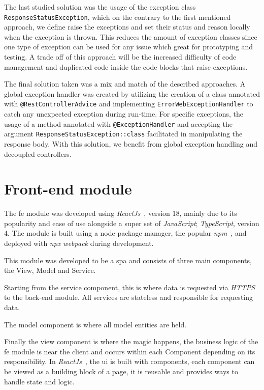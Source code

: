 The last studied solution was the usage of the exception class  \texttt{ResponseStatusException}, which on the contrary to the first mentioned approach, we define raise the exceptions and set their status and reason locally when the exception is thrown. This reduces the amount of exception classes since one type of exception can be used for any issue which great for prototyping and testing. A trade off of this approach will be the increased difficulty of code management and duplicated code inside the code blocks that raise exceptions. 

The final solution taken was a mix and match of the described approaches. A global exception handler was created by utilizing the creation of a class annotated with \texttt{@RestControllerAdvice} and implementing \texttt{ErrorWebExceptionHandler} to catch any unexpected exception during run-time. For specific exceptions, the usage of a method annotated with \texttt{@ExceptionHandler} and accepting the argument \texttt{ResponseStatusException::class} facilitated in manipulating the response body. With this solution, we benefit from global exception handling and decoupled controllers.


\section{Front-end module}

The \acrshort{fe} module was developed using \textit{ReactJs}~\cite{reactjs}, version 18, mainly due to its popularity and ease of use alongside a super set of \textit{JavaScript}; \textit{TypeScript}, version 4. The module is built using a node package manager, the popular \textit{npm}~\cite{npm}, and deployed with \textit{npx webpack} during development. 

This module was developed to be a \acrfull{spa} and consists of three main components, the View, Model and Service.

Starting from the service component, this is where data is requested via \textit{HTTPS} to the back-end module.
All services are stateless and responsible for requesting data.

The model component is where all model entities are held. 

Finally the view component is where the magic happens, the business logic of the \acrfull{fe} module is near the client and occurs within each Component depending on its responsibility.
In \textit{ReactJs}~\cite{reactjs}, the \acrshort{ui} is built with components, each component can be viewed as a building block of a page, it is reusable and provides ways to handle state and logic.

